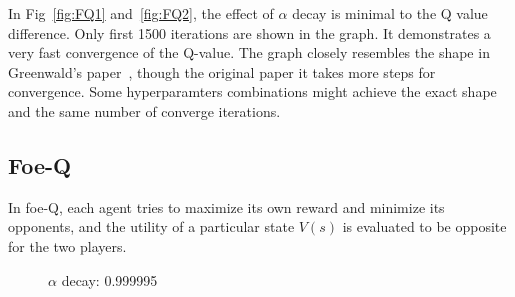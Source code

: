 \documentclass[conference]{IEEEtran}
\begin{document}
In Fig~\ref{fig:FQ1} and~\ref{fig:FQ2}, the effect of $\alpha$ decay is minimal to the Q value difference. Only first 1500 iterations are shown in the graph. It demonstrates a very fast convergence of the Q-value. The graph closely resembles the shape in Greenwald's paper~\cite{b1}, though the original paper it takes more steps for convergence. Some hyperparamters combinations might achieve the exact shape and the same number of converge iterations.


\subsection{Foe-Q}

In foe-Q, each agent tries to maximize its own reward and minimize its opponents, and the utility of a particular state $V(s)$ is evaluated to be opposite for the two players. 

\begin{figure}[htbp]
\centering
{}%
%
\centering
\caption{$\alpha$ decay: 0.999995}
\label{fig:FoQ1}
\end{figure}
\end{document}
